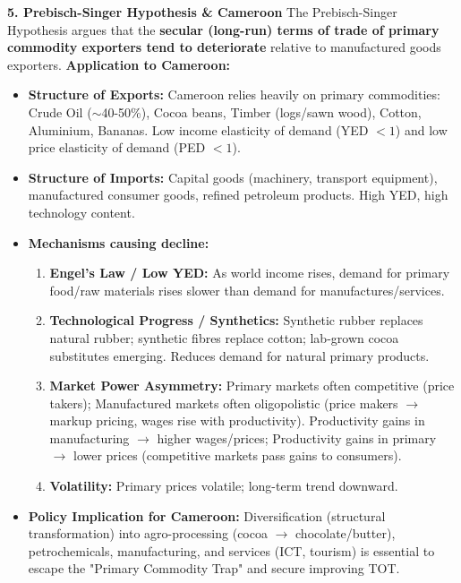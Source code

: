 \documentclass[11pt]{article}
\begin{document}
\begin{exoresolu}
\textbf{5. Prebisch-Singer Hypothesis \& Cameroon}
The Prebisch-Singer Hypothesis argues that the \textbf{secular (long-run) terms of trade of primary commodity exporters tend to deteriorate} relative to manufactured goods exporters.
\textbf{Application to Cameroon:}
\begin{itemize}
    \item \textbf{Structure of Exports:} Cameroon relies heavily on primary commodities: Crude Oil ($\sim$40-50\%), Cocoa beans, Timber (logs/sawn wood), Cotton, Aluminium, Bananas. Low income elasticity of demand (YED $< 1$) and low price elasticity of demand (PED $< 1$).
    \item \textbf{Structure of Imports:} Capital goods (machinery, transport equipment), manufactured consumer goods, refined petroleum products. High YED, high technology content.
    \item \textbf{Mechanisms causing decline:}
        \begin{enumerate}
            \item \textbf{Engel's Law / Low YED:} As world income rises, demand for primary food/raw materials rises slower than demand for manufactures/services.
            \item \textbf{Technological Progress / Synthetics:} Synthetic rubber replaces natural rubber; synthetic fibres replace cotton; lab-grown cocoa substitutes emerging. Reduces demand for natural primary products.
            \item \textbf{Market Power Asymmetry:} Primary markets often competitive (price takers); Manufactured markets often oligopolistic (price makers $\rightarrow$ markup pricing, wages rise with productivity). Productivity gains in manufacturing $\rightarrow$ higher wages/prices; Productivity gains in primary $\rightarrow$ lower prices (competitive markets pass gains to consumers).
            \item \textbf{Volatility:} Primary prices volatile; long-term trend downward.
        \end{enumerate}
    \item \textbf{Policy Implication for Cameroon:} Diversification (structural transformation) into agro-processing (cocoa $\rightarrow$ chocolate/butter), petrochemicals, manufacturing, and services (ICT, tourism) is essential to escape the "Primary Commodity Trap" and secure improving TOT.
\end{itemize}
\end{exoresolu}
\end{document}
